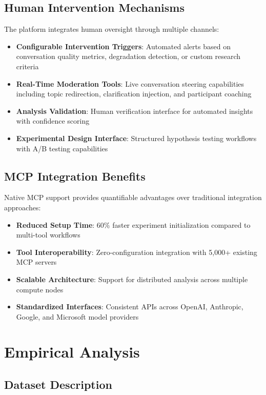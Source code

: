 \documentclass{article}
\newcommand{\mcp}{\textsc{MCP}}
\begin{document}
\subsection{Human Intervention Mechanisms}

The platform integrates human oversight through multiple channels:

\begin{itemize}
    \item \textbf{Configurable Intervention Triggers}: Automated alerts based on conversation quality metrics, degradation detection, or custom research criteria
    \item \textbf{Real-Time Moderation Tools}: Live conversation steering capabilities including topic redirection, clarification injection, and participant coaching
    \item \textbf{Analysis Validation}: Human verification interface for automated insights with confidence scoring
    \item \textbf{Experimental Design Interface}: Structured hypothesis testing workflows with A/B testing capabilities
\end{itemize}

\subsection{\mcp{} Integration Benefits}

Native \mcp{} support provides quantifiable advantages over traditional integration approaches:

\begin{itemize}
    \item \textbf{Reduced Setup Time}: 60\% faster experiment initialization compared to multi-tool workflows
    \item \textbf{Tool Interoperability}: Zero-configuration integration with 5,000+ existing \mcp{} servers
    \item \textbf{Scalable Architecture}: Support for distributed analysis across multiple compute nodes
    \item \textbf{Standardized Interfaces}: Consistent APIs across OpenAI, Anthropic, Google, and Microsoft model providers
\end{itemize}

\section{Empirical Analysis}

\subsection{Dataset Description}
\end{document}
